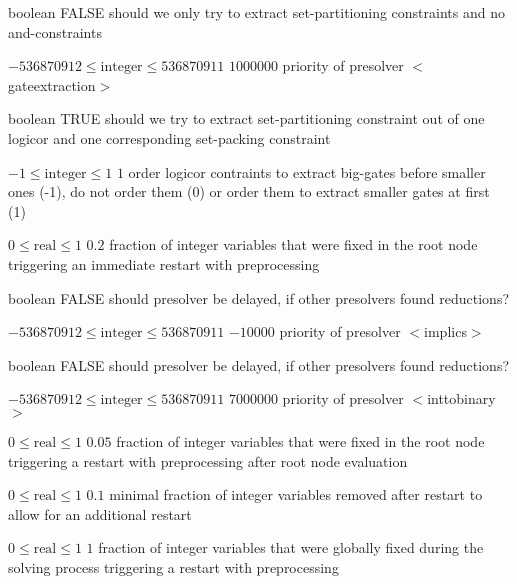 %
{boolean}%
{FALSE}%
{should we only try to extract set-partitioning constraints and no and-constraints}%
{}

%
{$-536870912\leq\textrm{integer}\leq536870911$}%
{$1000000$}%
{priority of presolver $<$gateextraction$>$}%
{}

%
{boolean}%
{TRUE}%
{should we try to extract set-partitioning constraint out of one logicor and one corresponding set-packing constraint}%
{}

%
{$-1\leq\textrm{integer}\leq1$}%
{$1$}%
{order logicor contraints to extract big-gates before smaller ones (-1), do not order them (0) or order them to extract smaller gates at first (1)}%
{}

%
{$0\leq\textrm{real}\leq1$}%
{$0.2$}%
{fraction of integer variables that were fixed in the root node triggering an immediate restart with preprocessing}%
{}

%
{boolean}%
{FALSE}%
{should presolver be delayed, if other presolvers found reductions?}%
{}

%
{$-536870912\leq\textrm{integer}\leq536870911$}%
{$-10000$}%
{priority of presolver $<$implics$>$}%
{}

%
{boolean}%
{FALSE}%
{should presolver be delayed, if other presolvers found reductions?}%
{}

%
{$-536870912\leq\textrm{integer}\leq536870911$}%
{$7000000$}%
{priority of presolver $<$inttobinary$>$}%
{}

%
{$0\leq\textrm{real}\leq1$}%
{$0.05$}%
{fraction of integer variables that were fixed in the root node triggering a restart with preprocessing after root node evaluation}%
{}

%
{$0\leq\textrm{real}\leq1$}%
{$0.1$}%
{minimal fraction of integer variables removed after restart to allow for an additional restart}%
{}

%
{$0\leq\textrm{real}\leq1$}%
{$1$}%
{fraction of integer variables that were globally fixed during the solving process triggering a restart with preprocessing}%
{}

